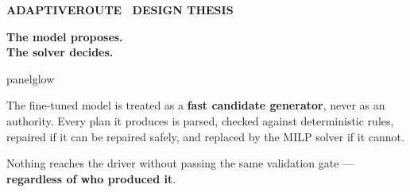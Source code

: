 \documentclass[aspectratio=169,10pt]{beamer}
\newcommand{\eyebrow}[1]{%
  {\color{arCyan2}\fontsize{6.6}{8}\selectfont\bfseries\MakeUppercase{#1}}}
\newcommand{\cy}[1]{{\color{arCyan2}\bfseries #1}}
\newenvironment{panelglow}[1]{%
  \begin{beamercolorbox}[wd=#1,rounded=true,shadow=false,sep=7pt]{panelglow}%
}{%
  \end{beamercolorbox}%
}
\begin{document}
{
\begin{frame}
  \vspace{1.2em}
  \centering
  \eyebrow{AdaptiveRoute \textperiodcentered\ Design thesis}

  \vspace{1.5em}
  {\fontsize{27}{33}\selectfont\bfseries\color{arText} The model proposes.}\\[0.25em]
  {\fontsize{27}{33}\selectfont\bfseries\color{arCyan2} The solver decides.}

  \vspace{1.8em}
  \begin{panelglow}{0.80\linewidth}
    \raggedright\small
    The fine-tuned model is treated as a \cy{fast candidate generator}, never as an authority.
    Every plan it produces is parsed, checked against deterministic rules, repaired if it can be
    repaired safely, and replaced by the MILP solver if it cannot.

    \vspace{0.7em}
    Nothing reaches the driver without passing the same validation gate ---
    \textbf{regardless of who produced it}.
  \end{panelglow}
\end{frame}
}
\end{document}

